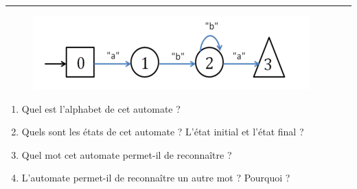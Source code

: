\newcommand{\numTD}{TD2}
\newcommand{\themeTD}{Machines de Turing, automates à états finis}


\hrule

\noindent{}

\exer
\vspace{-0.5cm}
\begin{figure}[h]
\includegraphics[width=.6\textwidth]{./images/TD1_1.png}
\end{figure}
\vspace{-0.5cm}

\begin{enumerate}
 \item Quel est l'alphabet de cet automate ?
 \item Quels sont les états de cet automate ? L'état initial et l'état final ?
 \item Quel mot cet automate permet-il de reconnaître ?
 \item L'automate permet-il de reconnaître un autre mot ? Pourquoi ?
\end{enumerate}

